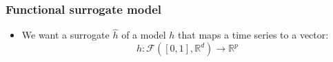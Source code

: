 \documentclass{beamer}
\begin{document}
\begin{frame}
  \frametitle{Functional surrogate model}
  
  \small
      \begin{itemize}
        \item We want a surrogate $\hat{h}$ of a model $h$ that maps a time series to a vector:
        \begin{equation*}
          h: \mathcal{F}([0, 1], \mathbb{R}^d) \rightarrow \mathbb{R}^p
        \end{equation*}
      \end{itemize}
  \vspace{-0.7cm}
  \begin{columns}
    \centering

\end{columns}
\end{frame}
\end{document}
